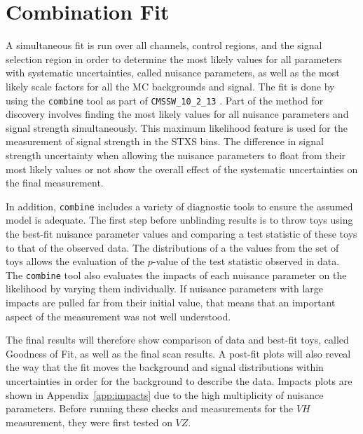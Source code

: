 \section{Combination Fit}

A simultaneous fit is run over all channels, control regions, and the signal selection region
in order to determine the most likely values for all
parameters with systematic uncertainties, called nuisance parameters,
as well as the most likely scale factors for all the MC backgrounds and signal.
The fit is done by using the \texttt{combine} tool \cite{cmsdocumentation} as part of
\texttt{CMSSW\_10\_2\_13} \cite{cmssw_doxygen}.
Part of the method for discovery involves finding the most likely values
for all nuisance parameters and signal strength simultaneously.
This maximum likelihood feature is used for the measurement of signal strength in
the STXS bins.
The difference in signal strength uncertainty when allowing the nuisance parameters to float
from their most likely values or not show the overall effect of the systematic uncertainties
on the final measurement.

In addition, \texttt{combine} includes a variety of diagnostic tools to ensure
the assumed model is adequate.
The first step before unblinding results is to throw toys using the best-fit
nuisance parameter values and comparing a test statistic of these toys
to that of the observed data.  
The distributions of a the values from the set of toys allows the evaluation of the $p$-value
of the test statistic observed in data.  
The \texttt{combine} tool also evaluates the impacts of each
nuisance parameter on the likelihood by varying them individually.
If nuisance parameters with large impacts are pulled far from their initial value,
that means that an important aspect of the measurement was not well understood.

The final results will therefore show comparison of data and best-fit toys,
called Goodness of Fit, as well as the final scan results.
A post-fit plots will also reveal the way that the fit moves the background and signal distributions
within uncertainties in order for the background to describe the
data. 
Impacts plots are shown in Appendix~\ref{app:impacts} due to the high multiplicity of nuisance parameters.
Before running these checks and measurements for the $V\!H$ measurement,
they were first tested on $V\!Z$.  

